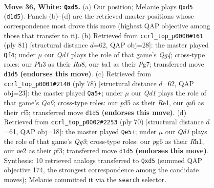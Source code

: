 \documentclass[11pt]{article}
\begin{document}
\clearpage

\begin{figure}[p]\centering
\begin{subfigure}{0.46\textwidth}\centering
\resizebox{\linewidth}{!}{%
\newchessgame
\chessboard[
  setfen={r5k1/1p3p2/q5p1/p2p4/7p/7P/P3nPP1/bN1Q3K w - - 0 36},
  showmover=false,
  pgfstyle=straightmove, color=movearrow, markmove={d1-d5}
]}
\caption{}
\end{subfigure}\hfill
\begin{subfigure}{0.46\textwidth}\centering
\resizebox{\linewidth}{!}{%
\newchessgame
\chessboard[
  setfen={r6k/6p1/1p3nBp/1P3Pq1/8/5P2/4Q2P/3R3K b - - 5 41},
  showmover=false,
  pgfstyle=straightmove, color=movearrow, markmove={g5-f4}
]}
\caption{}
\end{subfigure}
\\[4pt]
\begin{subfigure}{0.46\textwidth}\centering
\resizebox{\linewidth}{!}{%
\newchessgame
\chessboard[
  setfen={8/2k5/Q2qp3/3p1rpp/1p6/1P6/P1P3P1/1K2R3 w - - 3 40},
  showmover=false,
  pgfstyle=straightmove, color=movearrow, markmove={a6-a5}
]}
\caption{}
\end{subfigure}\hfill
\begin{subfigure}{0.46\textwidth}\centering
\resizebox{\linewidth}{!}{%
\newchessgame
\chessboard[
  setfen={2b1kq2/2p3p1/p2r4/8/1p2P3/1P3pQ1/1PP2N2/1K5R w - - 2 36},
  showmover=false,
  pgfstyle=straightmove, color=movearrow, markmove={g3-e5}
]}
\caption{}
\end{subfigure}
\caption{\textbf{Move 36, White: \texttt{Qxd5}.} (a) Our position; Melanie plays \texttt{Qxd5} (\texttt{d1d5}). Panels (b)--(d) are the retrieved master positions whose correspondence most drove this move (highest QAP objective among those that transfer to it). (b) Retrieved from \texttt{ccrl\_top\_p0000\#161} (ply 81) [structural distance $d$=62, QAP obj=28]: the master played \texttt{Qf4}; under $\mu$ our \emph{Qd1} plays the role of that game's \emph{Qg4}; cross-type roles: our \emph{P}h3 as their \emph{R}a8, our \emph{b}a1 as their \emph{P}g7; transferred move \texttt{d1d5} \textbf{(endorses this move)}. (c) Retrieved from \texttt{ccrl\_top\_p0001\#2140} (ply 78) [structural distance $d$=62, QAP obj=23]: the master played \texttt{Qa5+}; under $\mu$ our \emph{Qd1} plays the role of that game's \emph{Qa6}; cross-type roles: our \emph{p}d5 as their \emph{R}e1, our \emph{q}a6 as their \emph{r}f5; transferred move \texttt{d1d5} \textbf{(endorses this move)}. (d) Retrieved from \texttt{ccrl\_top\_p0002\#2253} (ply 70) [structural distance $d$=61, QAP obj=18]: the master played \texttt{Qe5+}; under $\mu$ our \emph{Qd1} plays the role of that game's \emph{Qg3}; cross-type roles: our \emph{p}g6 as their \emph{R}h1, our \emph{n}e2 as their \emph{p}f3; transferred move \texttt{d1d5} \textbf{(endorses this move)}. Synthesis: 10 retrieved analogs transferred to \texttt{Qxd5} (summed QAP objective 174, the strongest correspondence among the candidate moves); Melanie committed it via the \texttt{search} selector.}
\label{fig:thought-m70}
\end{figure}
\end{document}
